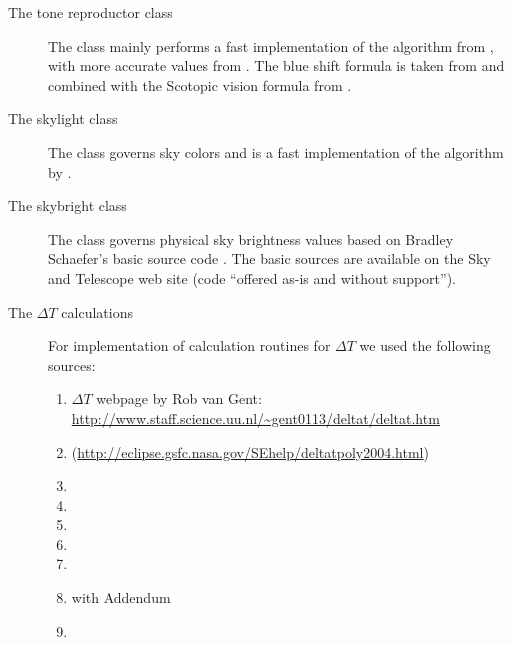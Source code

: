 \begin{description}
	\item[The tone reproductor class]
		The class mainly performs a fast implementation of the algorithm
		from \citet{TumblinRushmeier:1993}, with more accurate values from \citet{DevlinChalmersWilkie:2002}. 
		The blue shift formula is taken from \citet{WannJensen:2000} and combined with the Scotopic vision formula from  \citet{Larson:1997}.
	\item[The skylight class]
		The class governs sky colors and is a fast implementation of the algorithm by \citet{Preetham:1999}.
	\item[The skybright class]
		The class governs physical sky brightness values based on Bradley Schaefer's   basic source code \citep{Schaefer:1998}.
		The basic sources are available on the Sky and Telescope web site (code ``offered as-is and without support'').
	\item[The $\Delta T$ calculations]
		For implementation of calculation routines for $\Delta T$ we used the following sources:
		\begin{enumerate}
		\item $\Delta T$ webpage by Rob van Gent: \url{http://www.staff.science.uu.nl/~gent0113/deltat/deltat.htm}
		\item {} (\url{http://eclipse.gsfc.nasa.gov/SEhelp/deltatpoly2004.html})
		\item {}
		\item {} %
		\item {} %
		\item {} %
		\item {} %
		\item {} %
		     with Addendum \citep{2005JHA....36..339M}
		\item {}%

\end{enumerate}
\end{description}
